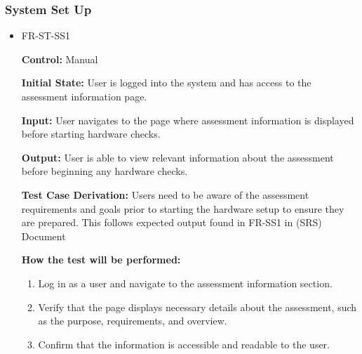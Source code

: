 \documentclass[12pt, titlepage]{article}
\begin{document}
\subsubsection{System Set Up}

\begin{itemize}
  \item FR-ST-SS1
    \begin{mdframed}[linewidth=0.5mm]
      \textbf{Control:} Manual \par
      \textbf{Initial State:} User is logged into the system and has access to the assessment information page. \par
      \textbf{Input:} User navigates to the page where assessment information is displayed before starting hardware checks. \par
      \textbf{Output:} User is able to view relevant information about the assessment before beginning any hardware checks. \par
      \textbf{Test Case Derivation:} Users need to be aware of the assessment requirements and goals prior to starting 
      the hardware setup to ensure they are prepared. This follows expected output found in FR-SS1 in (SRS) Document \par
      \textbf{How the test will be performed:}
      \begin{enumerate}[noitemsep]
        \item Log in as a user and navigate to the assessment information section.
        \item Verify that the page displays necessary details about the assessment, such as the purpose, requirements, and overview.
        \item Confirm that the information is accessible and readable to the user.
      \end{enumerate}
    \end{mdframed}


\end{itemize}
\end{document}
